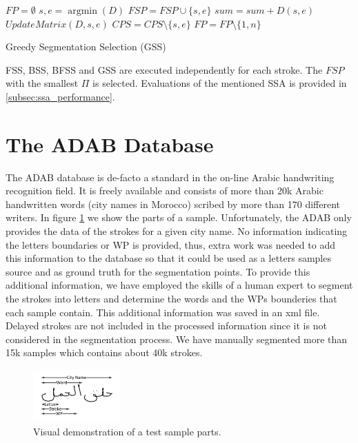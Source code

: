 \documentclass[journal,compsoc]{IEEEtran}
\begin{document}
\begin{algorithm}
$FP=\emptyset$\;
{
	${s,e} = \mathop {\arg \min}(D)$\;
	$FSP = FSP \cup \{s,e\}$\;
	$sum = sum + D(s,e)$\;
	$UpdateMatrix(D,s,e)$\;
	$CPS = CPS\setminus\{s,e\}$\;
}
$FP=FP\setminus\{1,n\}$\;

\caption{Greedy Segmentation Selection (GSS)}
\label{alg:gss}
\end{algorithm}

FSS, BSS, BFSS and GSS are executed independently for each stroke. The $FSP$ with the smallest $\Pi$ is selected. Evaluations of the mentioned SSA is provided in \ref{subsec:ssa_performance}. 



\section{The ADAB Database}
\label{sec:database}
The ADAB database is de-facto a standard in the on-line Arabic handwriting recognition field. It is freely available and consists of more than 20k Arabic handwritten words (city names in Morocco) scribed by more than 170 different writers. 
In figure \ref{fig:sample_parts} we show the parts of a sample.
Unfortunately, the ADAB only provides the data of the strokes for a given city name. 
No information indicating the letters boundaries or WP is provided, thus, extra work was needed to add this information to the database so that it could be used as a letters samples source and as ground truth for the segmentation points.
To provide this additional information, we have employed the skills of a human expert to segment the strokes into letters and determine the words and the WPs bounderies that each sample contain. 
This additional information was saved in an xml file. Delayed strokes are not included in the processed information since it is not considered in the segmentation process.
We have manually segmented more than 15k samples which contains about 40k strokes. 

\begin{figure}
\centering
\includegraphics[width=0.3\textwidth]{./figures/sample_parts}
\caption{Visual demonstration of a test sample parts.}
\label{fig:sample_parts}
\end{figure}
\end{document}
